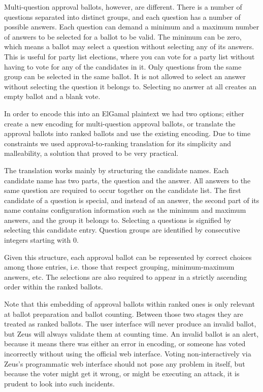 \documentclass[letterpaper,10pt]{article}
\begin{document}
Multi-question approval ballots, however, are different.
There is a number of questions separated into distinct groups,
and each question has a number of possible answers.
Each question can demand a minimum and a maximum number of answers
to be selected for a ballot to be valid.
The minimum can be zero, which means a ballot may select a question
without selecting any of its answers.
This is useful for party list elections, where you can vote for
a party list without having to vote for any of the candidates in it.
Only questions from the same group can be selected in the same ballot.
It is not allowed to select an answer without selecting the question
it belongs to.
Selecting no answer at all creates an empty ballot and a blank vote.

In order to encode this into an ElGamal plaintext we had two options;
either create a new encoding for multi-question approval ballots,
or translate the approval ballots into ranked ballots and use the
existing encoding.
Due to time constraints we used approval-to-ranking translation for
its simplicity and malleability, a solution that proved to be very
practical.

The translation works mainly by structuring the candidate names.
Each candidate name has two parts, the question and the answer.
All answers to the same question are required to occur together
on the candidate list.
The first candidate of a question is special,
and instead of an answer, the second part of its name contains
configuration information such as the minimum and maximum answers,
and the group it belongs to.
Selecting a questions is signified by selecting this candidate entry.
Question groups are identified by consecutive integers starting with 0.

Given this structure, each approval ballot can be represented by
correct choices among those entries, i.e. those that respect
grouping, minimum-maximum answers, etc.
The selections are also required to appear in a strictly ascending order
within the ranked ballots.

Note that this embedding of approval ballots within ranked ones is
only relevant at ballot preparation and ballot counting.
Between those two stages they are treated as ranked ballots.
The user interface will never produce an invalid ballot,
but Zeus will always validate them at counting time.
An invalid ballot is an alert, because it means there was either
an error in encoding, or someone has voted incorrectly without using
the official web interface.
Voting non-interactively via Zeus's programmatic web interface
should not pose any problem in itself,
but because the voter might get it wrong,
or might be executing an attack,
it is prudent to look into such incidents.
\end{document}
